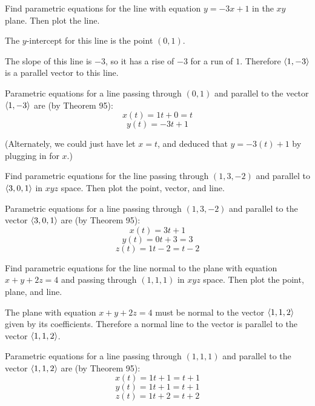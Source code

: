 \documentclass[letterpaper, twoside, 12pt]{book}
\begin{document}
          \begin{problem}
            Find parametric equations for the line with equation $y=-3x+1$
            in the $xy$ plane. Then plot the line.
          \end{problem}

          \begin{solution}
  The $y$-intercept for this line is the point $(0,1)$.

  The slope of this line is $-3$, so it has a rise of $-3$ for a run of $1$.
  Therefore $\langle1,-3\rangle$ is a parallel vector to this line.

  Parametric equations for a line passing through $(0,1)$ and parallel
  to the vector $\langle1,-3\rangle$ are (by Theorem 95):
  \[
    x(t) = 1t + 0 = t
  \]
  \[
    y(t) = -3t + 1
  \]

  (Alternately, we could just have let $x=t$, and deduced that
  $y=-3(t)+1$ by plugging in for $x$.)
          \end{solution}

          \begin{problem}
            Find parametric equations for the line passing through $(1,3,-2)$
            and parallel to $\langle3,0,1\rangle$ in $xyz$ space. Then plot the point,
            vector, and line.
          \end{problem}

          \begin{solution}
  Parametric equations for a line passing through $(1,3,-2)$ and parallel
  to the vector $\langle3,0,1\rangle$ are (by Theorem 95):
  \[
    x(t) = 3t + 1
  \]
  \[
    y(t) = 0t + 3 = 3
  \]
  \[
    z(t) = 1t - 2 = t - 2
  \]
          \end{solution}

          \begin{problem}
            Find parametric equations for the line normal to the plane with
            equation $x+y+2z=4$ and passing through $(1,1,1)$ in $xyz$ space.
            Then plot the point, plane, and line.
          \end{problem}

          \begin{solution}
  The plane with equation $x+y+2z=4$ must be normal to the vector $\langle1,1,2\rangle$
  given by its coefficients. Therefore a normal line to the vector is
  parallel to the vector $\langle1,1,2\rangle$.

  Parametric equations for a line passing through $(1,1,1)$ and parallel
  to the vector $\langle1,1,2\rangle$ are (by Theorem 95):
  \[
    x(t) = 1t + 1 = t + 1
  \]
  \[
    y(t) = 1t + 1 = t + 1
  \]
  \[
    z(t) = 1t + 2 = t + 2
  \]
          \end{solution}
\end{document}
